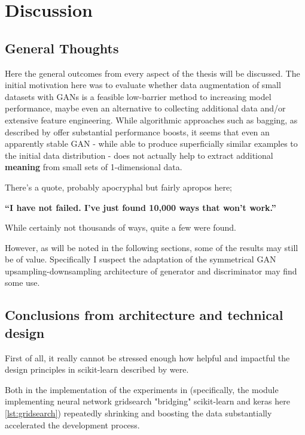 \chapter{Discussion}
\label{chapter:discussion}

\section{General Thoughts}

Here the general outcomes from every aspect of the thesis will be discussed.
The initial motivation here was to evaluate whether data augmentation of small datasets with \acp{GAN} is a feasible low-barrier method to increasing model performance, maybe even an alternative to collecting additional data and/or extensive feature engineering.
While algorithmic approaches such as \ac{bagging}, as described by \cite{bagging} offer substantial performance boosts, it seems that even an apparently stable \ac{GAN} - while able to produce superficially similar examples to the initial data distribution - does not actually help to extract additional \textbf{meaning} from small sets of 1-dimensional data.

There's a quote, probably apocryphal but fairly apropos here;

\begin{center} 
	
	\textbf{“I have not failed. I’ve just found 10,000 ways that won’t work.”}
	
\end{center}

While certainly not thousands of ways, quite a few were found.

However, as will be noted in the following sections, some of the results may still be of value. Specifically I suspect the adaptation of the symmetrical \ac{GAN} upsampling-downsampling architecture of generator and discriminator may find some use.

\pagebreak

\section{Conclusions from architecture and technical design}

First of all, it really cannot be stressed enough how helpful and impactful the design principles in scikit-learn described by \cite{buitinck2013api} were. 

Both in the implementation of the experiments in (specifically, the module implementing neural network gridsearch "bridging" scikit-learn and keras here \ref{lst:gridsearch}) repeatedly shrinking and boosting the data substantially accelerated the development process.

